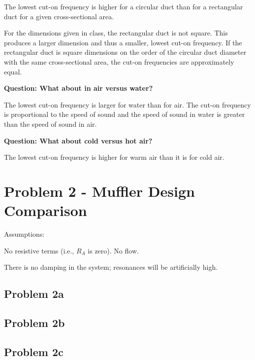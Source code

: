 The lowest cut-on frequency is higher for a circular duct than for a
 rectangular duct for a given cross-sectional area.

 For the dimensions given in class, the rectangular duct is not square.
 This produces a larger dimension and thus a smaller, lowest cut-on
 frequency.  If the rectangular duct is square dimensions on the order
 of the circular duct diameter with the same cross-sectional area, the
 cut-on frequencies are approximately equal.



\vspace{0.25cm}
\textbf{Question:  What about in air versus water?}

 The lowest cut-on frequency is larger for water than for air.  The cut-on
 frequency is proportional to the speed of sound and the speed of sound in
 water is greater than the speed of sound in air.



\vspace{0.25cm}
\textbf{Question:  What about cold versus hot air?}

 The lowest cut-on frequency is higher for warm air than it is for cold air.









\newpage
\section*{Problem 2 - Muffler Design Comparison}

 Assumptions:

   No resistive terms (i.e., $R_A$ is zero).
   No flow.

There is no damping in the system;  resonances will be artificially high.

\subsection*{Problem 2a}

\subsection*{Problem 2b}

\subsection*{Problem 2c}










